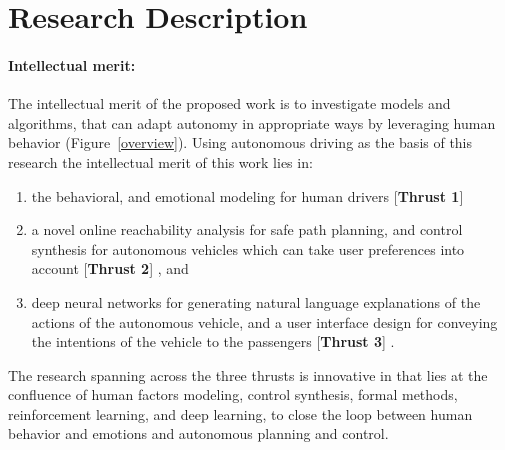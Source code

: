\section{Research Description}
\label{sec:research}

\paragraph{Intellectual merit:}
\label{sec:im}

The intellectual merit of the proposed work is to investigate models and algorithms, that can adapt autonomy in appropriate ways by leveraging human behavior (Figure~\ref{overview}). Using autonomous driving as the basis of this research the intellectual merit of this work lies in:
\begin{enumerate}[itemsep=0pt,parsep=0pt,topsep=4pt,leftmargin=0.4in]
    \item the behavioral, and emotional modeling for human drivers [\textbf{Thrust 1}]
    \item a novel online reachability analysis for safe path planning, and control synthesis for autonomous vehicles which can take user preferences into account [\textbf{Thrust 2}]  , and
    \item deep neural networks for generating natural language explanations of the actions of the autonomous vehicle, and a user interface design for conveying the intentions of the vehicle to the passengers [\textbf{Thrust 3}] . 
\end{enumerate} 
The research spanning across the three thrusts is innovative in that lies at the confluence of human factors modeling, control synthesis, formal methods, reinforcement learning, and deep learning, to close the loop between human behavior and emotions and autonomous planning and control.






